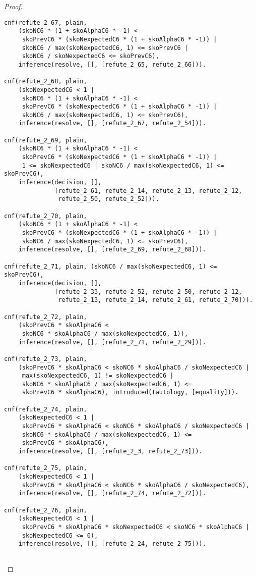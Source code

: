 \begin{proof}
\begin{verbatim}
cnf(refute_2_67, plain,
    (skoNC6 * (1 + skoAlphaC6 * -1) <
     skoPrevC6 * (skoNexpectedC6 * (1 + skoAlphaC6 * -1)) |
     skoNC6 / max(skoNexpectedC6, 1) <= skoPrevC6 |
     skoNC6 / skoNexpectedC6 <= skoPrevC6),
    inference(resolve, [], [refute_2_65, refute_2_66])).

cnf(refute_2_68, plain,
    (skoNexpectedC6 < 1 |
     skoNC6 * (1 + skoAlphaC6 * -1) <
     skoPrevC6 * (skoNexpectedC6 * (1 + skoAlphaC6 * -1)) |
     skoNC6 / max(skoNexpectedC6, 1) <= skoPrevC6),
    inference(resolve, [], [refute_2_67, refute_2_54])).

cnf(refute_2_69, plain,
    (skoNC6 * (1 + skoAlphaC6 * -1) <
     skoPrevC6 * (skoNexpectedC6 * (1 + skoAlphaC6 * -1)) |
     1 <= skoNexpectedC6 | skoNC6 / max(skoNexpectedC6, 1) <= skoPrevC6),
    inference(decision, [],
              [refute_2_61, refute_2_14, refute_2_13, refute_2_12,
               refute_2_50, refute_2_52])).

cnf(refute_2_70, plain,
    (skoNC6 * (1 + skoAlphaC6 * -1) <
     skoPrevC6 * (skoNexpectedC6 * (1 + skoAlphaC6 * -1)) |
     skoNC6 / max(skoNexpectedC6, 1) <= skoPrevC6),
    inference(resolve, [], [refute_2_69, refute_2_68])).

cnf(refute_2_71, plain, (skoNC6 / max(skoNexpectedC6, 1) <= skoPrevC6),
    inference(decision, [],
              [refute_2_33, refute_2_52, refute_2_50, refute_2_12,
               refute_2_13, refute_2_14, refute_2_61, refute_2_70])).

cnf(refute_2_72, plain,
    (skoPrevC6 * skoAlphaC6 <
     skoNC6 * skoAlphaC6 / max(skoNexpectedC6, 1)),
    inference(resolve, [], [refute_2_71, refute_2_29])).

cnf(refute_2_73, plain,
    (skoPrevC6 * skoAlphaC6 < skoNC6 * skoAlphaC6 / skoNexpectedC6 |
     max(skoNexpectedC6, 1) != skoNexpectedC6 |
     skoNC6 * skoAlphaC6 / max(skoNexpectedC6, 1) <=
     skoPrevC6 * skoAlphaC6), introduced(tautology, [equality])).

cnf(refute_2_74, plain,
    (skoNexpectedC6 < 1 |
     skoPrevC6 * skoAlphaC6 < skoNC6 * skoAlphaC6 / skoNexpectedC6 |
     skoNC6 * skoAlphaC6 / max(skoNexpectedC6, 1) <=
     skoPrevC6 * skoAlphaC6),
    inference(resolve, [], [refute_2_3, refute_2_73])).

cnf(refute_2_75, plain,
    (skoNexpectedC6 < 1 |
     skoPrevC6 * skoAlphaC6 < skoNC6 * skoAlphaC6 / skoNexpectedC6),
    inference(resolve, [], [refute_2_74, refute_2_72])).

cnf(refute_2_76, plain,
    (skoNexpectedC6 < 1 |
     skoPrevC6 * skoAlphaC6 * skoNexpectedC6 < skoNC6 * skoAlphaC6 |
     skoNexpectedC6 <= 0),
    inference(resolve, [], [refute_2_24, refute_2_75])).


\end{verbatim}
\end{proof}
